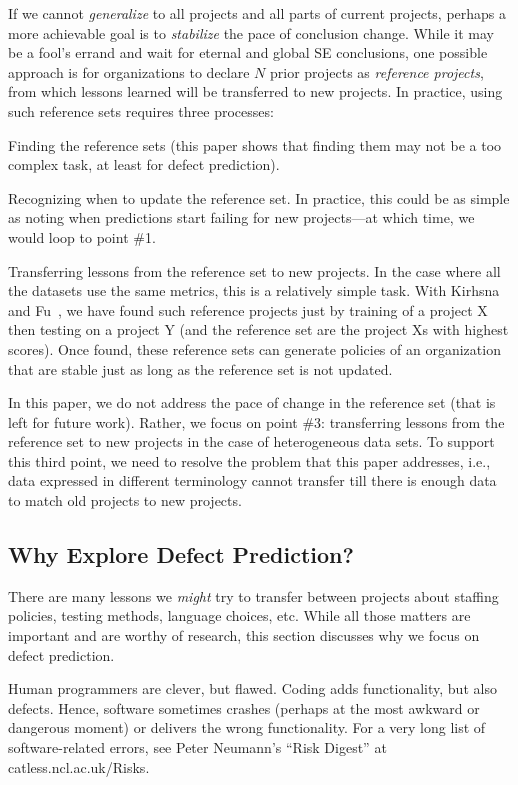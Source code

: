 If we cannot {\em generalize} to all projects and all parts
of current projects, perhaps a more achievable goal is to {\em stabilize} the pace of conclusion change. 
While it may be 
a fool's errand and wait for eternal and global SE
conclusions, one possible approach is for organizations
to declare $N$ prior projects as {\em reference projects},
from which lessons learned will be transferred to new projects.
In practice, using such reference sets requires three processes:
\squishlist
\item Finding the reference sets (this paper shows that finding
  them may not be a too complex task, at least for defect prediction).
  \item Recognizing when to update the reference set. In practice,
  this could be as simple as noting when predictions start failing for new projects---at which time, we would loop to point \#1.
\item Transferring
  lessons from the reference set to new projects.  
\squishend
In the case where all the datasets use the same metrics, this is a relatively
simple task. With Kirhsna and Fu~\cite{krishna16}, we have found such reference projects just by training of
a project X then testing on a project Y (and the reference set are the project Xs with highest scores).
Once found, these reference sets can generate policies of an organization that are 
stable just as long as the reference set is not updated.

In this paper, we do not address the pace of change in the reference set
(that is left for future work).
Rather, we focus on point \#3: transferring lessons from
the reference set to new projects in the case of heterogeneous data sets. To support this third point,
we need to resolve the problem
  that this paper addresses, i.e., data expressed in different terminology
  cannot transfer till there is enough data to match old projects to new projects.

 


\subsection{Why Explore Defect Prediction?}

There are many lessons we {\em might} try to transfer between projects
about staffing policies, testing methods, language choices, etc. While
all those matters are important and are worthy of research, this section
discusses why we focus on defect prediction.  

Human programmers are clever, but flawed. Coding  adds functionality, but also defects.
Hence, software sometimes crashes (perhaps at the most awkward or dangerous moment) or delivers
the wrong functionality. For a very long list of software-related errors,
see  Peter Neumann's ``Risk Digest'' at catless.ncl.ac.uk/Risks.

